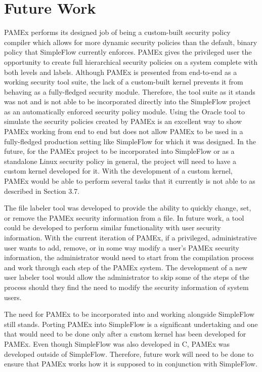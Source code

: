 \section{Future Work}
\label{sec:FutureWork}
\par 
\vspace{\baselineskip}
\hspace{1em}
PAMEx performs its designed job of being a custom-built 
security policy compiler which allows for more dynamic security 
policies than the default, binary policy that SimpleFlow currently 
enforces. PAMEx gives the privileged user the opportunity to create 
full hierarchical security policies on a system complete with both 
levels and labels. Although PAMEx is presented from end-to-end as a 
working security tool suite, the lack of a custom-built kernel prevents 
it from behaving as a fully-fledged security module. Therefore, the 
tool suite as it stands was not and is not able to be incorporated 
directly into the SimpleFlow project as an automatically enforced 
security policy module. Using the Oracle tool to simulate the security 
policies created by PAMEx is an excellent way to show PAMEx working 
from end to end but does not allow PAMEx to be used in a fully-fledged 
production setting like SimpleFlow for which it was designed. In the 
future, for the PAMEx project to be incorporated into SimpleFlow or as 
a standalone Linux security policy in general, the project will need 
to have a custom kernel developed for it. With the development of a 
custom kernel, PAMEx would be able to perform several tasks that 
it currently is not able to as described in Section 3.7. 

The file labeler tool was developed to provide the ability to quickly 
change, set, or remove the PAMEx security information from a file. In 
future work, a tool could be developed to perform similar functionality 
with user security information. With the current iteration of PAMEx, if 
a privileged, administrative user wants to add, remove, or in some way 
modify a user’s PAMEx security information, the administrator would 
need to start from the compilation process and work through each step 
of the PAMEx system. The development of a new user labeler tool would 
allow the administrator to skip some of the steps of the process should 
they find the need to modify the security information of system users. 

The need for PAMEx to be incorporated into and working 
alongside SimpleFlow still stands. Porting PAMEx into SimpleFlow is a 
significant undertaking and one that would need to be done only after a 
custom kernel has been developed for PAMEx. Even though SimpleFlow was 
also developed in C, PAMEx was developed 
outside of SimpleFlow. Therefore, future work will need to be done to 
ensure that PAMEx works how it is supposed to in conjunction with 
SimpleFlow. 
